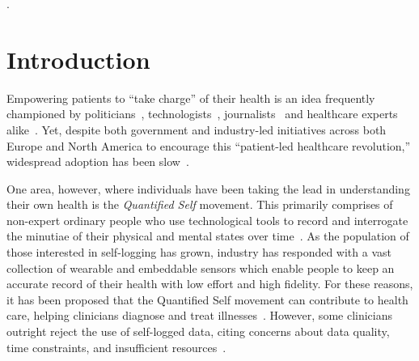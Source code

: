 \documentclass{sigchi}
\begin{document}


.

\section{Introduction}

Empowering patients to ``take charge'' of their health is an idea frequently championed by politicians~\cite{kelsey_2015, Fox2015}, technologists~\cite{ihealth_2015}, journalists~\cite{goetz_its_2010} and healthcare experts alike~\cite{Swan2012}.  Yet, despite both government and industry-led initiatives across both Europe and North America to encourage this ``patient-led healthcare revolution,'' widespread adoption has been slow~\cite{vezyridis_adoption_2015}. 

One area, however, where individuals have been taking the lead in understanding their own health is the \emph{Quantified Self} movement. This primarily comprises of non-expert ordinary people who use technological tools to record and interrogate the minutiae of their physical and mental states over time~\cite{Swan2012}.   As the population of those interested in self-logging has grown, industry has responded with a vast collection of wearable and embeddable sensors which enable people to keep an accurate record of their health with low effort and high fidelity. For these reasons, it has been proposed that the Quantified Self movement can contribute to health care, helping clinicians diagnose and treat illnesses~\cite{Swan2009}. However, some clinicians outright reject the use of self-logged data, citing concerns about data quality, time constraints, and insufficient resources~\cite{sullivan_guess_2014}. %
\end{document}

